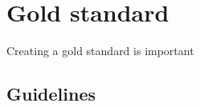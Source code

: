 \chapter{Gold standard}
Creating a gold standard is important \autocite{koehn2009} 

\section{Guidelines}
